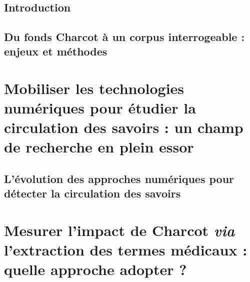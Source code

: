 \documentclass[a4paper,12pt]{book}
\begin{document}
\renewcommand{\arraystretch}{1.5}


~
\thispagestyle{empty}
\setcounter{page}{0}
\newpage



\chapter{Introduction}







\chapter{Du fonds Charcot à un corpus interrogeable : enjeux et méthodes}

%

\part{Mobiliser les technologies numériques pour étudier la circulation des savoirs : un champ de recherche en plein essor}
\chapter{L’évolution des approches numériques pour détecter la circulation des savoirs}





\part{Mesurer l'impact de Charcot \textit{via} l'extraction des termes médicaux : quelle approche adopter ?}

\end{document}
